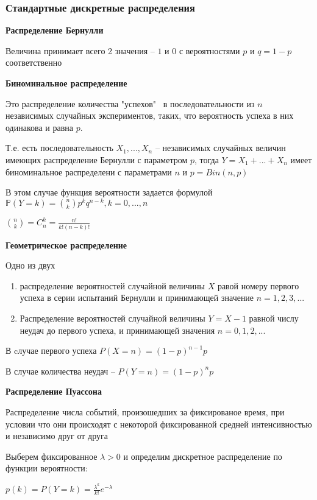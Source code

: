 \documentclass{article}
\begin{document}
\subsubsection{ Стандартные дискретные распределения}

{\bf Распределение Бернулли}

Величина принимает всего 2 значения -- $1$ и $0$ с вероятностями $p$ и $q = 1 - p$ соответственно

{\bf Биноминальное распределение}

Это распределение количества "успехов" \ в последовательности из $n$ независимых случайных экспериментов, таких, что вероятность успеха в них одинакова и равна $p$.

Т.е. есть последовательность $X_1, ..., X_n$ -- независимых случайных величин имеющих распределение Бернулли с параметром $p$, тогда $Y = X_1 + ... + X_n$ имеет биноминальное распределени с параметрами $n$ и $p = Bin(n, p)$ 

В этом случае функция вероятности задается формулой $\mathbb{P}(Y = k) = {n \choose k} p^k q^{n - k}, k = 0, ..., n$

${n \choose k} = C_n^k = \frac{n!}{k!(n-k)!}$

{\bf Геометрическое распределение}

Одно из двух

\begin{enumerate}
	\item распределение вероятностей случайной величины $X$ равой номеру первого успеха в серии испытаний Бернулли и принимающей значение $n = 1, 2, 3,...$
	\item Распределение вероятностей случайной величины $Y = X - 1$ равной числу неудач до первого успеха, и принимающей значения $n = 0, 1, 2,...$
\end{enumerate}

В cлучае первого успеха $P(X = n) = (1 - p)^{n - 1}p$

В случае количества неудач -- $P(Y = n) = (1 - p)^n p$


{\bf Распределение Пуассона}

Распределение числа событий, произошедших за фиксированое время, при условии что они происходят с некоторой фиксированной средней интенсивностью и независимо друг от друга

Выберем фиксированное $\lambda > 0$ и определим дискретное распределение по функции вероятности:

$p(k) = P(Y = k) = \frac{\lambda^k}{k!}e^{-\lambda}$
\end{document}
